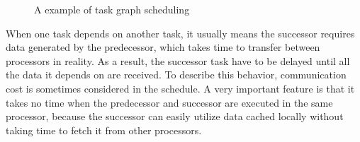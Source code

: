 \documentclass[msc,deptreport, cs]{infthesis}
\begin{document}
\begin{figure}[!htb]
    \centering
    \vspace{1em}
     \hspace{2em}
    \caption{A example of task graph scheduling}
    \label{fig:example}
\end{figure}

When one task depends on another task, it usually means the successor requires data generated by the predecessor, which takes time to transfer between processors in reality. As a result, the successor task have to be delayed until all the data it depends on are received. To describe this behavior, communication cost is sometimes considered in the schedule. A very important feature is that it takes no time when the predecessor and successor are executed in the same processor, because the successor can easily utilize data cached locally without taking time to fetch it from other processors.
\end{document}
